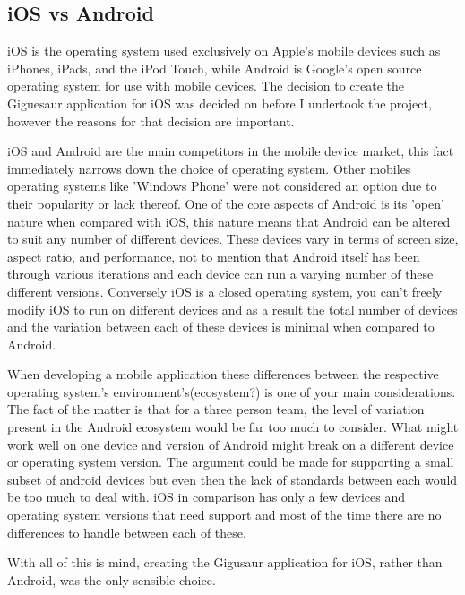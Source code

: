 \documentclass{article}
\begin{document}
\subsection{iOS vs Android}

iOS is the operating system used exclusively on Apple's mobile devices such as iPhones, iPads, and the iPod Touch, while Android is Google's open source operating system for use with mobile devices. The decision to create the Giguesaur application for iOS was decided on before I undertook the project, however the reasons for that decision are important. 

iOS and Android are the main competitors in the mobile device market, this fact immediately narrows down the choice of operating system. Other mobiles operating systems like 'Windows Phone' were not considered an option due to their popularity or lack thereof. One of the core aspects of Android is its 'open' nature when compared with iOS, this nature means that Android can be altered to suit any number of different devices. These devices vary in terms of screen size, aspect ratio, and performance, not to mention that Android itself has been through various iterations and each device can run a varying number of these different versions. Conversely iOS is a closed operating system, you can't freely modify iOS to run on different devices and as a result the total number of devices and the variation between each of these devices is minimal when compared to Android. 

When developing a mobile application these differences between the respective operating system's environment's(ecosystem?) is one of your main considerations. The fact of the matter is that for a three person team, the level of variation present in the Android ecosystem would be far too much to consider. What might work well on one device and version of Android might break on a different device or operating system version. The argument could be made for supporting a small subset of android devices but even then the lack of standards between each would be too much to deal with. iOS in comparison has only a few devices and operating system versions that need support and most of the time there are no differences to handle between each of these. 

With all of this is mind, creating the Gigusaur application for iOS, rather than Android, was the only sensible choice. 
\end{document}
